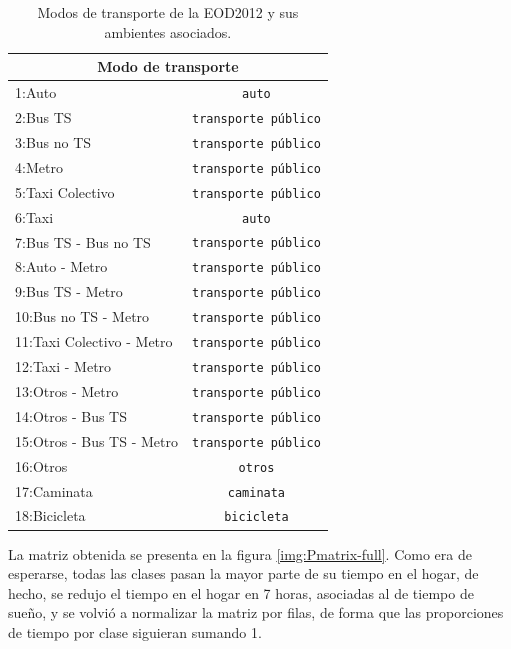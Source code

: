\begin{table}[h!]
\centering
\begin{tabular}{||l|c||} 
 \hline
 \multicolumn{2}{||c||}{\textbf{Modo de transporte}} \\
 \hline
 1:Auto                        & \texttt{auto}\\
 2:Bus TS                      & \texttt{transporte público}\\
 3:Bus no TS                   & \texttt{transporte público}\\
 4:Metro                       & \texttt{transporte público}\\
 5:Taxi Colectivo              & \texttt{transporte público}\\
 6:Taxi                        & \texttt{auto}\\
 7:Bus TS - Bus no TS          & \texttt{transporte público}\\
 8:Auto - Metro                & \texttt{transporte público}\\
 9:Bus TS - Metro              & \texttt{transporte público}\\
 10:Bus no TS - Metro          & \texttt{transporte público}\\
 11:Taxi Colectivo - Metro     & \texttt{transporte público}\\
 12:Taxi - Metro               & \texttt{transporte público}\\
 13:Otros - Metro              & \texttt{transporte público}\\
 14:Otros - Bus TS             & \texttt{transporte público}\\
 15:Otros - Bus TS - Metro     & \texttt{transporte público}\\
 16:Otros                      & \texttt{otros}\\
 17:Caminata                   & \texttt{caminata}\\
 18:Bicicleta                  & \texttt{bicicleta}\\
 \hline
\end{tabular}
\caption{Modos de transporte de la EOD2012 y sus ambientes asociados.}
\label{table:ambientes-modo-full}
\end{table}

La matriz obtenida se presenta en la figura \ref{img:Pmatrix-full}. Como era de esperarse, todas las clases pasan la mayor parte de su tiempo en el hogar, de hecho, se redujo el tiempo en el hogar en 7 horas, asociadas al de tiempo de sueño, y se volvió a normalizar la matriz por filas, de forma que las proporciones de tiempo por clase siguieran sumando 1.

